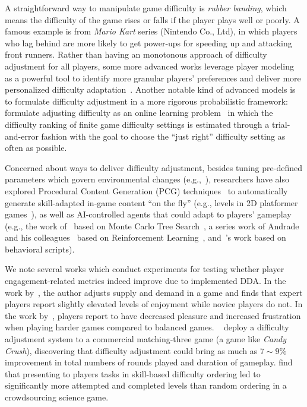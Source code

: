 A straightforward way to manipulate game difficulty is \textit{rubber banding}, which means the difficulty of the game rises or falls if the player plays well or poorly. A famous example is from \textit{Mario Kart} series (Nintendo Co., Ltd), in which players who lag behind are more likely to get power-ups for speeding up and attacking front runners. Rather than having an monotonous approach of difficulty adjustment for all players, some more advanced works leverage player modeling~\cite{yannakakis2013player} as a powerful tool to identify more granular players' preferences and deliver more personalized difficulty adaptation~\cite{missura2009player,togelius2006making,yannakakis2005player,zook2012temporal}. Another notable kind of advanced models is to formulate difficulty adjustment in a more rigorous probabilistic framework: \cite{missura2011predicting} formulate adjusting difficulty as an online learning problem~\cite{auer1995gambling} in which the difficulty ranking of finite game difficulty settings is estimated through a trial-and-error fashion with the goal to choose the ``just right'' difficulty setting as often as possible. 

Concerned about ways to deliver difficulty adjustment, besides tuning pre-defined parameters which govern environmental changes (e.g.,~\cite{hunicke2005case,baldwin2014effect}), researchers have also explored Procedural Content Generation (PCG) techniques~\cite{yannakakis2011experience,togelius2011search} to automatically generate skill-adapted in-game content ``on the fly'' (e.g., levels in 2D platformer games~\cite{jennings2010polymorph}), as well as AI-controlled agents that could adapt to players' gameplay (e.g., the work of~\cite{demediuk2017monte} based on Monte Carlo Tree Search~\cite{browne2012survey}, a series work of Andrade and his colleagues~\cite{andrade2006dynamic,andrade2005challenge,andrade2005extending} based on Reinforcement Learning~\cite{sutton1998reinforcement}, and~\cite{spronck2004difficulty}'s work based on behavioral scripts). 

We note several works which conduct experiments for testing whether player engagement-related metrics indeed improve due to implemented DDA. In the work by~\cite{hunicke2005case}, the author adjusts supply and demand in a game and finds that expert players report slightly elevated levels of enjoyment while novice players do not. In the work by~\cite{van2009incongruity}, players report to have decreased pleasure and increased frustration when playing harder games compared to balanced games. ~\cite{xue2017dynamic} deploy a difficulty adjustment system to a commercial matching-three game (a game like \textit{Candy Crush}), discovering that difficulty adjustment could bring as much as $7 \sim 9 \%$ improvement in total numbers of rounds played and duration of gameplay. \cite{sarkar2017engagement} find that presenting to players 
tasks in skill-based difficulty ordering led to significantly more attempted and completed levels than random ordering in a crowdsourcing science game. 

